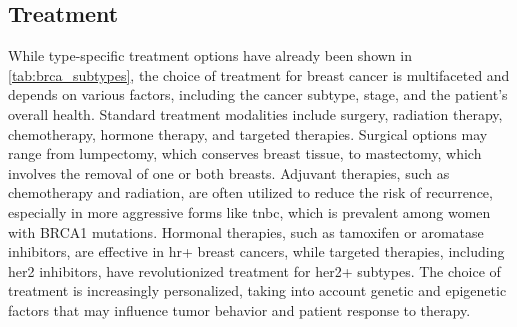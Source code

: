 \subsection{Treatment}
\label{sec:brca_treatment}

While type-specific treatment options have already been shown in
\cref{tab:brca_subtypes}, the choice of treatment for breast cancer is
multifaceted and depends on various factors, including the cancer subtype,
stage, and the patient's overall health.
Standard treatment modalities include surgery, radiation therapy, chemotherapy,
hormone therapy, and targeted therapies.
Surgical options may range from lumpectomy, which conserves breast tissue, to
mastectomy, which involves the removal of one or both
breasts\supercite{metcalfe_contralateral_2014,wu_breast_2014}.
Adjuvant therapies, such as chemotherapy and radiation, are often utilized to
reduce the risk of recurrence, especially in more aggressive forms like
\gls{tnbc}, which is prevalent among women with BRCA1
mutations\supercite{metcalfe_contralateral_2014}.
Hormonal therapies, such as tamoxifen or aromatase inhibitors, are effective in
\gls{hr+} breast cancers, while targeted therapies, including \gls{her2}
inhibitors, have revolutionized treatment for \gls{her2+}
subtypes\supercite{eccles_critical_2013,pace_breast_2016}.
The choice of treatment is increasingly personalized, taking into account
genetic and epigenetic factors that may influence tumor behavior and patient
response to therapy\supercite{khakpour_methylomics_2017}.

